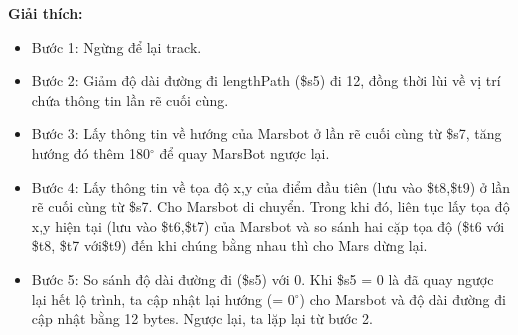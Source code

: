 \documentclass[a4paper,12pt]{article}
\begin{document}
        \noindent
	    \textbf{Giải thích:}
	        \begin{itemize}
	            \item Bước 1: Ngừng để lại track.
	            \item Bước 2: Giảm độ dài đường đi lengthPath (\$s5) đi 12, đồng thời lùi về vị trí chứa thông tin lần rẽ cuối cùng.
	            \item Bước 3: Lấy thông tin về hướng của Marsbot ở lần rẽ cuối cùng từ \$s7, tăng hướng đó thêm 180$^{\circ}$ để quay MarsBot ngược lại.
	            \item Bước 4: Lấy thông tin về tọa độ x,y của điểm đầu tiên (lưu vào \$t8,\$t9) ở lần rẽ cuối cùng từ \$s7. Cho Marsbot di chuyển. Trong khi đó, liên tục lấy tọa độ x,y hiện tại (lưu vào \$t6,\$t7) của Marsbot và so sánh hai cặp tọa độ (\$t6 với \$t8, \$t7 với\$t9) đến khi chúng bằng nhau thì cho Mars dừng lại.
	            \item Bước 5: So sánh độ dài đường đi (\$s5) với 0. Khi \$s5 = 0 là đã quay ngược lại hết lộ trình, ta cập nhật lại hướng (= 0$^{\circ}$) cho Marsbot và độ dài đường đi cập nhật bằng 12 bytes. Ngược lại, ta lặp lại từ bước 2.
	        \end{itemize}
	\clearpage
\end{document}

